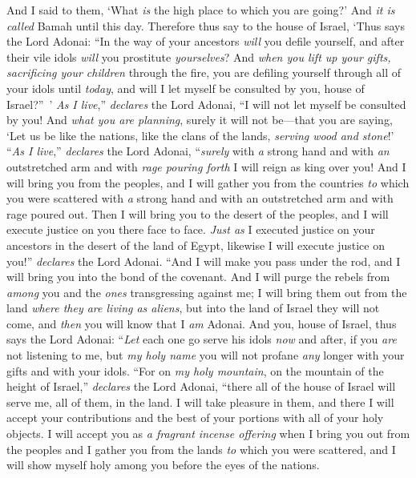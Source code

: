 \begin{biblechapter}
\verse And I said to them, ‘What \textit{is} the high place to which you are going?’ And \textit{it is called} Bamah until this day.
\verse Therefore thus say to the house of Israel, ‘Thus says the Lord Adonai: “In the way of your ancestors \textit{will} you defile yourself, and after their vile idols \textit{will} you prostitute \textit{yourselves}?
\verse And \textit{when you lift up your gifts, sacrificing your children} through the fire, you are defiling yourself through all of your idols until \textit{today}, and will I let myself be consulted by you, house of Israel?” ’ \textit{As I live},” \textit{declares} the Lord Adonai, “I will not let myself be consulted by you!
\verse And \textit{what you are planning}, surely it will not be—that you are saying, ‘Let us be like the nations, like the clans of the lands, \textit{serving wood and stone}!’
\verse “\textit{As I live},” \textit{declares} the Lord Adonai, “\textit{surely} with \textit{a} strong hand and with \textit{an} outstretched arm and with \textit{rage pouring forth} I will reign as king over you!
\verse And I will bring you from the peoples, and I will gather you from the countries \textit{to} which you were scattered with \textit{a} strong hand and with an outstretched arm and with rage poured out.
\verse Then I will bring you to the desert of the peoples, and I will execute justice on you there face to face.
\verse \textit{Just as} I executed justice on your ancestors in the desert of the land of Egypt, likewise I will execute justice on you!” \textit{declares} the Lord Adonai.
\verse “And I will make you pass under the rod, and I will bring you into the bond of the covenant.
\verse And I will purge the rebels from \textit{among} you and the \textit{ones} transgressing against me; I will bring them out from the land \textit{where they are living as aliens}, but into the land of Israel they will not come, and \textit{then} you will know that I \textit{am} Adonai.
\verse And you, house of Israel, thus says the Lord Adonai: “\textit{Let} each one go serve his idols \textit{now} and after, if you \textit{are} not listening to me, but \textit{my holy name} you will not profane \textit{any} longer with your gifts and with your idols.
\verse “For on \textit{my holy mountain}, on the mountain of the height of Israel,” \textit{declares} the Lord Adonai, “there all of the house of Israel will serve me, all of them, in the land. I will take pleasure in them, and there I will accept your contributions and the best of your portions with all of your holy objects.
\verse I will accept you as \textit{a fragrant incense offering} when I bring you out from the peoples and I gather you from the lands \textit{to} which you were scattered, and I will show myself holy among you before the eyes of the nations.

\end{biblechapter}
